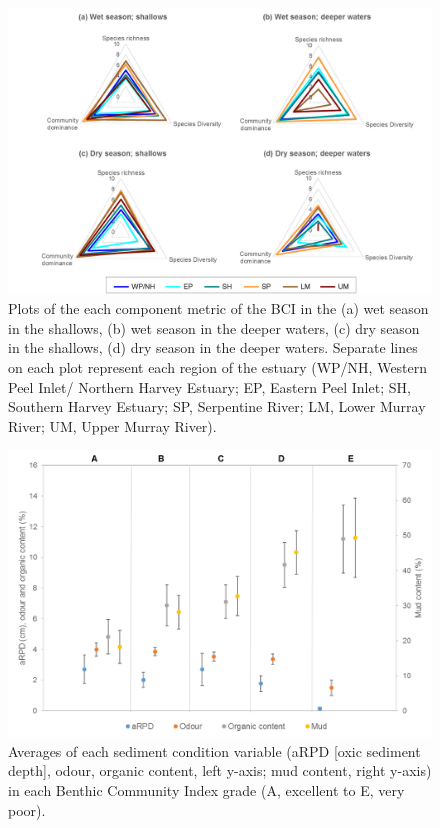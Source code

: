 \documentclass[
]{book}
\begin{document}
\begin{figure}
\includegraphics[width=1\linewidth]{images/BMI/picture15} \caption{Plots of the each component metric of the BCI in the (a) wet season in the shallows, (b) wet season in the deeper waters, (c) dry season in the shallows, (d) dry season in the deeper waters. Separate lines on each plot represent each region of the estuary (WP/NH, Western Peel Inlet/ Northern Harvey Estuary; EP, Eastern Peel Inlet; SH, Southern Harvey Estuary; SP, Serpentine River; LM, Lower Murray River; UM, Upper Murray River).}\label{fig:BMI-pic15}
\end{figure}

\begin{figure}
\includegraphics[width=1\linewidth]{images/BMI/picture16} \caption{Averages of each sediment condition variable (aRPD [oxic sediment depth], odour, organic content, left y-axis; mud content, right y-axis) in each Benthic Community Index grade (A, excellent to E, very poor).}\label{fig:BMI-pic16}
\end{figure}
\end{document}
